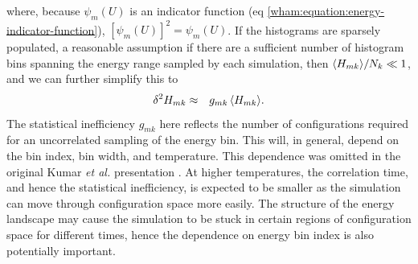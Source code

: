 where, because $\psi_m(U)$ is an indicator function (eq \ref{wham:equation:energy-indicator-function}), $[\psi_m(U)]^2 = \psi_m(U)$.  If the histograms are sparsely populated, a reasonable assumption if there are a sufficient number of histogram bins spanning the energy range sampled by each simulation, then $\langle H_{mk} \rangle / N_k \ll 1$, and we can further simplify this to
\begin{eqnarray}
\delta^2 H_{mk} &\approx& g_{mk} \, \langle H_{mk} \rangle . \label{wham:equation:histogram-error}
\end{eqnarray}
The statistical inefficiency $g_{mk}$ here reflects the number of configurations required for an uncorrelated sampling of the energy bin.  This will, in general, depend on the bin index, bin width, and temperature.  This dependence was omitted in the original Kumar \emph{et al.} presentation \cite{kumar:1992a}.  At higher temperatures, the correlation time, and hence the statistical inefficiency, is expected to be smaller as the simulation can move through configuration space more easily.  The structure of the energy landscape may cause the simulation to be stuck in certain regions of configuration space for different times, hence the dependence on energy bin index is also potentially important.

